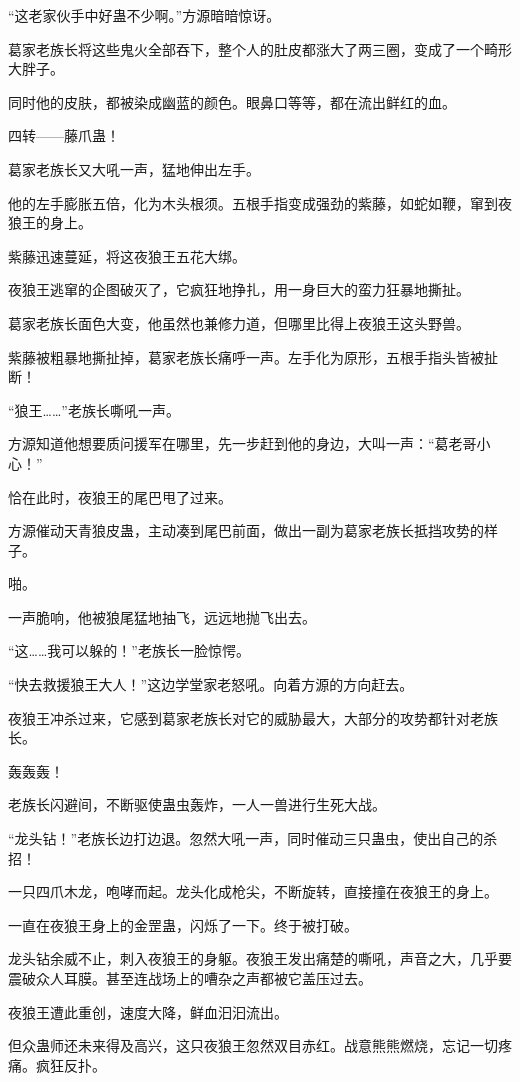 \begin{this_body}
“这老家伙手中好蛊不少啊。”方源暗暗惊讶。

葛家老族长将这些鬼火全部吞下，整个人的肚皮都涨大了两三圈，变成了一个畸形大胖子。

同时他的皮肤，都被染成幽蓝的颜色。眼鼻口等等，都在流出鲜红的血。

四转——藤爪蛊！

葛家老族长又大吼一声，猛地伸出左手。

他的左手膨胀五倍，化为木头根须。五根手指变成强劲的紫藤，如蛇如鞭，窜到夜狼王的身上。

紫藤迅速蔓延，将这夜狼王五花大绑。

夜狼王逃窜的企图破灭了，它疯狂地挣扎，用一身巨大的蛮力狂暴地撕扯。

葛家老族长面色大变，他虽然也兼修力道，但哪里比得上夜狼王这头野兽。

紫藤被粗暴地撕扯掉，葛家老族长痛呼一声。左手化为原形，五根手指头皆被扯断！

“狼王……”老族长嘶吼一声。

方源知道他想要质问援军在哪里，先一步赶到他的身边，大叫一声：“葛老哥小心！”

恰在此时，夜狼王的尾巴甩了过来。

方源催动天青狼皮蛊，主动凑到尾巴前面，做出一副为葛家老族长抵挡攻势的样子。

啪。

一声脆响，他被狼尾猛地抽飞，远远地抛飞出去。

“这……我可以躲的！”老族长一脸惊愕。

“快去救援狼王大人！”这边学堂家老怒吼。向着方源的方向赶去。

夜狼王冲杀过来，它感到葛家老族长对它的威胁最大，大部分的攻势都针对老族长。

轰轰轰！

老族长闪避间，不断驱使蛊虫轰炸，一人一兽进行生死大战。

“龙头钻！”老族长边打边退。忽然大吼一声，同时催动三只蛊虫，使出自己的杀招！

一只四爪木龙，咆哮而起。龙头化成枪尖，不断旋转，直接撞在夜狼王的身上。

一直在夜狼王身上的金罡蛊，闪烁了一下。终于被打破。

龙头钻余威不止，刺入夜狼王的身躯。夜狼王发出痛楚的嘶吼，声音之大，几乎要震破众人耳膜。甚至连战场上的嘈杂之声都被它盖压过去。

夜狼王遭此重创，速度大降，鲜血汩汩流出。

但众蛊师还未来得及高兴，这只夜狼王忽然双目赤红。战意熊熊燃烧，忘记一切疼痛。疯狂反扑。


\end{this_body}
